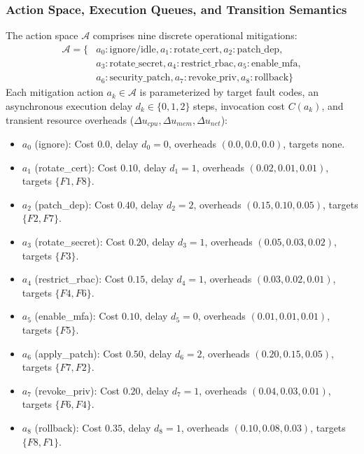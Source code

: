 \documentclass[ASNA,twocolumn]{USG}
\begin{document}
\subsubsection{Action Space, Execution Queues, and Transition Semantics}
\label{subsec:action_space}
The action space $\mathcal{A}$ comprises nine discrete operational mitigations:
\begin{align}
    \label{eq:action_space}
    \mathcal{A} = \{ & a_0: \text{ignore/idle}, a_1: \text{rotate\_cert}, a_2: \text{patch\_dep}, \nonumber \\
    & a_3: \text{rotate\_secret}, a_4: \text{restrict\_rbac}, a_5: \text{enable\_mfa}, \nonumber \\
    & a_6: \text{security\_patch}, a_7: \text{revoke\_priv}, a_8: \text{rollback} \}
\end{align}
Each mitigation action $a_k \in \mathcal{A}$ is parameterized by target fault codes, an asynchronous execution delay $d_k \in \{0, 1, 2\}$ steps, invocation cost $C(a_k)$, and transient resource overheads ($\Delta u_{cpu}, \Delta u_{mem}, \Delta u_{net}$):
\begin{itemize}
    \item $a_0$ (ignore): Cost $0.0$, delay $d_0 = 0$, overheads $(0.0, 0.0, 0.0)$, targets none.
    \item $a_1$ (rotate\_cert): Cost $0.10$, delay $d_1 = 1$, overheads $(0.02, 0.01, 0.01)$, targets $\{F1, F8\}$.
    \item $a_2$ (patch\_dep): Cost $0.40$, delay $d_2 = 2$, overheads $(0.15, 0.10, 0.05)$, targets $\{F2, F7\}$.
    \item $a_3$ (rotate\_secret): Cost $0.20$, delay $d_3 = 1$, overheads $(0.05, 0.03, 0.02)$, targets $\{F3\}$.
    \item $a_4$ (restrict\_rbac): Cost $0.15$, delay $d_4 = 1$, overheads $(0.03, 0.02, 0.01)$, targets $\{F4, F6\}$.
    \item $a_5$ (enable\_mfa): Cost $0.10$, delay $d_5 = 0$, overheads $(0.01, 0.01, 0.01)$, targets $\{F5\}$.
    \item $a_6$ (apply\_patch): Cost $0.50$, delay $d_6 = 2$, overheads $(0.20, 0.15, 0.05)$, targets $\{F7, F2\}$.
    \item $a_7$ (revoke\_priv): Cost $0.20$, delay $d_7 = 1$, overheads $(0.04, 0.03, 0.01)$, targets $\{F6, F4\}$.
    \item $a_8$ (rollback): Cost $0.35$, delay $d_8 = 1$, overheads $(0.10, 0.08, 0.03)$, targets $\{F8, F1\}$.
\end{itemize}
\end{document}
